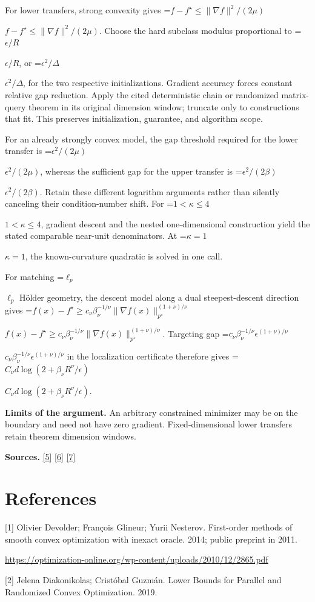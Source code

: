 \documentclass[10pt,a4paper]{article}
\newcommand{\AtlasMath}[1]{\par\begingroup\centering\setbox0=\hbox{$\displaystyle #1$}\ifdim\wd0>1.4\linewidth\typeout{ATLAS WIDE FORMULA: \the\wd0}\fi\ifdim\wd0>\linewidth\resizebox{\linewidth}{!}{\box0}\else\box0\fi\par\endgroup}
\newcommand{\AtlasInlineMath}[1]{\begingroup\setbox0=\hbox{$#1$}\ifdim\wd0>.4\linewidth\endgroup\AtlasMath{#1}\else\endgroup$#1$\fi}
\begin{document}
For lower transfers, strong convexity gives \AtlasInlineMath{f-f^\star\le\|\nabla f\|^2/(2\mu)}. Choose the hard subclass modulus proportional to \AtlasInlineMath{\epsilon/R}, or \AtlasInlineMath{\epsilon^2/\Delta}, for the two respective initializations. Gradient accuracy forces constant relative gap reduction. Apply the cited deterministic chain or randomized matrix-query theorem in its original dimension window; truncate only to constructions that fit. This preserves initialization, guarantee, and algorithm scope.

For an already strongly convex model, the gap threshold required for the lower transfer is \AtlasInlineMath{\epsilon^2/(2\mu)}, whereas the sufficient gap for the upper transfer is \AtlasInlineMath{\epsilon^2/(2\beta)}. Retain these different logarithm arguments rather than silently canceling their condition-number shift. For \AtlasInlineMath{1<\kappa\le4}, gradient descent and the nested one-dimensional construction yield the stated comparable near-unit denominators. At \AtlasInlineMath{\kappa=1}, the known-curvature quadratic is solved in one call.

For matching \AtlasInlineMath{\ell_p} Hölder geometry, the descent model along a dual steepest-descent direction gives
\AtlasInlineMath{f(x)-f^\star\ge c_\nu\beta_\nu^{-1/\nu}\|\nabla f(x)\|_{p^\star}^{(1+\nu)/\nu}}.
Targeting gap \AtlasInlineMath{c_\nu\beta_\nu^{-1/\nu}\epsilon^{(1+\nu)/\nu}} in the localization certificate therefore gives
\AtlasInlineMath{C_\nu d\log(2+\beta_\nu R^\nu/\epsilon)}.

\textbf{Limits of the argument.} An arbitrary constrained minimizer may be on the boundary and need not have zero gradient. Fixed-dimensional lower transfers retain theorem dimension windows.

\textbf{Sources.} \href{https://arxiv.org/pdf/2101.09740v2}{[5]} \href{https://arxiv.org/pdf/2609.33360v2}{[6]} \href{https://arxiv.org/pdf/2609.10874}{[7]}

\section{References}
[1] Olivier Devolder; François Glineur; Yurii Nesterov. First-order methods of smooth convex optimization with inexact oracle. 2014; public preprint in 2011.

\url{https://optimization-online.org/wp-content/uploads/2010/12/2865.pdf}

[2] Jelena Diakonikolas; Cristóbal Guzmán. Lower Bounds for Parallel and Randomized Convex Optimization. 2019.
\end{document}
